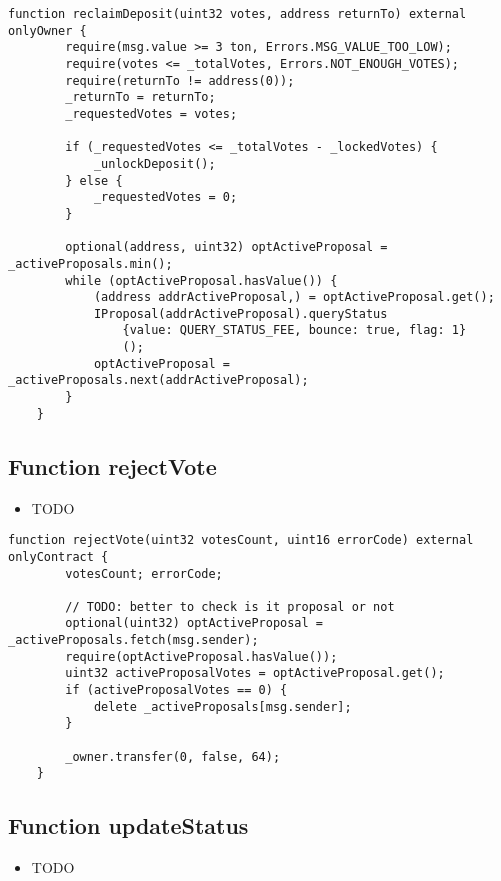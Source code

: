 \begin{lstlisting}[firstnumber=103]
    function reclaimDeposit(uint32 votes, address returnTo) external onlyOwner {
        require(msg.value >= 3 ton, Errors.MSG_VALUE_TOO_LOW);
        require(votes <= _totalVotes, Errors.NOT_ENOUGH_VOTES);
        require(returnTo != address(0));
        _returnTo = returnTo;
        _requestedVotes = votes;

        if (_requestedVotes <= _totalVotes - _lockedVotes) {
            _unlockDeposit();
        } else {
            _requestedVotes = 0;
        }

        optional(address, uint32) optActiveProposal = _activeProposals.min();
        while (optActiveProposal.hasValue()) {
            (address addrActiveProposal,) = optActiveProposal.get();
            IProposal(addrActiveProposal).queryStatus
                {value: QUERY_STATUS_FEE, bounce: true, flag: 1}
                ();
            optActiveProposal = _activeProposals.next(addrActiveProposal);
        }
    }
\end{lstlisting}

\subsection{Function rejectVote}

\begin{itemize}
\item TODO
\end{itemize}

\begin{lstlisting}[firstnumber=87]
    function rejectVote(uint32 votesCount, uint16 errorCode) external onlyContract {
        votesCount; errorCode;

        // TODO: better to check is it proposal or not
        optional(uint32) optActiveProposal = _activeProposals.fetch(msg.sender);
        require(optActiveProposal.hasValue());
        uint32 activeProposalVotes = optActiveProposal.get();
        if (activeProposalVotes == 0) {
            delete _activeProposals[msg.sender];
        }

        _owner.transfer(0, false, 64);
    }
\end{lstlisting}

\subsection{Function updateStatus}

\begin{itemize}
\item TODO
\end{itemize}

